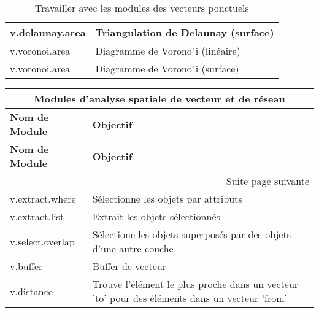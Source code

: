 \begin{table}[H]
\begin{tabular}{|p{4cm}|p{10cm}|}
  \hline v.delaunay.area & Triangulation de Delaunay (surface) \\
  \hline v.voronoi.area & Diagramme de Vorono"i (linéaire) \\
  \hline v.voronoi.area & Diagramme de Vorono"i (surface) \\
\hline
\end{tabular}
\caption{Travailler avec les modules des vecteurs ponctuels}
\end{table}

\begin{center}
{\setlength{\extrarowheight}{10pt}
\small
\begin{longtable}{|p{2.5cm}|p{11.5cm}|}
  \hline \multicolumn{2}{|c|}{\textbf{Modules d'analyse spatiale de vecteur et de réseau}}\\
\hline \textbf{Nom de Module}&\textbf{Objectif}\\
\endfirsthead
\hline \textbf{Nom de Module}&\textbf{Objectif}\\
\endhead
\hline \multicolumn{2}{|r|}{{Suite page suivante}} \\ \hline
\endfoot
\endlastfoot
  \hline v.extract.where & Sélectionne les objets par attributs\\
  \hline v.extract.list & Extrait les objets sélectionnés\\
  \hline v.select.overlap & Sélectione les objets superposés par des objets d'une autre couche\\
  \hline v.buffer & Buffer de vecteur\\
  \hline v.distance & Trouve l'élément le plus proche dans un vecteur 'to' pour des éléments dans un vecteur 'from'\\

\end{longtable}}
\end{center}
